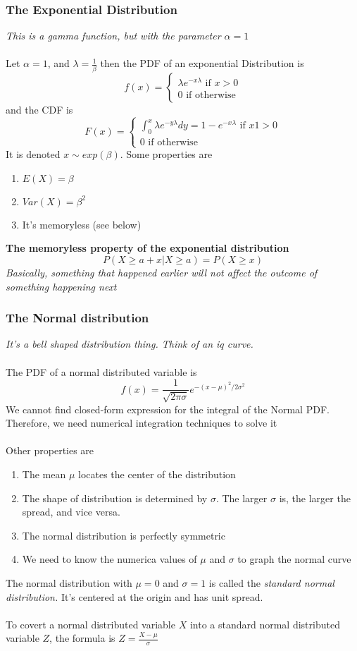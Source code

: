 \documentclass{article}
\begin{document}
\subsubsection{The Exponential Distribution}
\textit{This is a gamma function, but with the parameter $\alpha=1$}\\\\
Let $\alpha=1$, and $\lambda = \frac1\beta$ then the PDF of an exponential Distribution is
\[
f(x)=
\begin{cases}
    \lambda e^{-x\lambda}\text{ if }x > 0\\
    0 \text{ if otherwise}
\end{cases}
\]
and the CDF is
\[
F(x)=
\begin{cases}
    \int^x_0\lambda e^{-y\lambda}dy = 1- e^{-x\lambda}\text{ if }x 1> 0\\
    0 \text{ if otherwise}
\end{cases}
\]
It is denoted $x\sim exp(\beta)$. Some properties are
\begin{enumerate}
    \item $E(X)=\beta$
    \item $Var(X) = \beta ^2$
    \item It's memoryless (see below)
\end{enumerate}
\textbf{The memoryless property of the exponential distribution}
\[P(X\geq a+x|X\geq a) = P(X\geq x)\]
\textit{Basically, something that happened earlier will not affect the outcome of something happening next}
\subsubsection{The Normal distribution}
\textit{It's a bell shaped distribution thing. Think of an iq curve.}\\\\
The PDF of a normal distributed variable is
\[f(x)=\frac1{\sqrt{2\pi\sigma}}e^{-(x-\mu)^2/2\sigma^2}\]
We cannot find closed-form expression for the integral of the Normal PDF. Therefore, we need numerical integration techniques to solve it\\\\
Other properties are 
\begin{enumerate}
    \item The mean $\mu$ locates the center of the distribution
    \item The shape of distribution is determined by $\sigma$. The larger $\sigma$ is, the larger the spread, and vice versa.
    \item The normal distribution is perfectly symmetric
    \item We need to know the numerica values of $\mu$ and $\sigma$ to graph the normal curve
\end{enumerate}
The normal distribution with $\mu = 0$ and $\sigma = 1$ is called the \textit{standard normal distribution.} It's centered at the origin and has unit spread. \\\\
To covert a normal distributed variable $X$ into a standard normal distributed variable $Z$, the formula is
$Z=\frac{X-\mu}{\sigma}$
\end{document}
